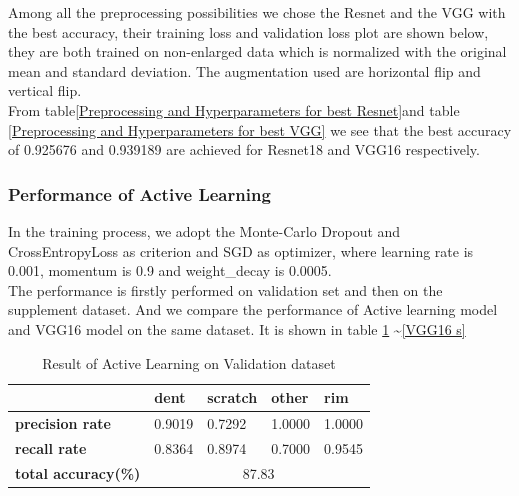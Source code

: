 \documentclass[lang=english,inputenc=utf8,fontsize=10pt]{ldvarticle}
\begin{document}



Among all the preprocessing possibilities we chose the Resnet and the VGG with the best accuracy, their training loss and validation loss plot are shown below, they are both trained on non-enlarged data which is normalized with the original mean and standard deviation. The augmentation used are horizontal flip and vertical flip.\\

From table\ref{Preprocessing and Hyperparameters for best Resnet}and table \ref{Preprocessing and Hyperparameters for best VGG} we see that the best accuracy of 0.925676 and 0.939189 are achieved for Resnet18 and VGG16 respectively.


\subsubsection{Performance of Active Learning}
In the training process, we adopt the Monte-Carlo Dropout and CrossEntropyLoss as criterion and SGD as optimizer, where learning rate is 0.001, momentum is 0.9 and weight\_decay is 0.0005.\\

The performance is firstly performed on validation set and then on the supplement dataset. And we compare the performance of Active learning model and VGG16 model on the same dataset. It is shown in table \ref{Active V} \textasciitilde \ref{VGG16 s} 

\begin{table}[H]   
    \begin{center}   
    \caption{Result of Active Learning on Validation dataset}  
    \label{Active V} 
    \begin{tabular}{|m{2cm}<{\centering}|m{2cm}<{\centering}|m{2.0cm}<{\centering}|m{2cm}<{\centering}|m{2cm}<{\centering}|}   
    \hline   &\textbf{dent} & \textbf{scratch} & \textbf{other} & \textbf{rim}\\ 
    \hline   \textbf{precision rate}  & 0.9019 & 0.7292 & 1.0000 & 1.0000  \\ 
    \hline   \textbf{recall rate} & 0.8364 & 0.8974 & 0.7000 & 0.9545   \\  
    \hline   \textbf{total accuracy(\%)} & \multicolumn{4}{|c|}{87.83} \\  
    \hline 
    \end{tabular}   
    \end{center}   
\end{table}
\end{document}
